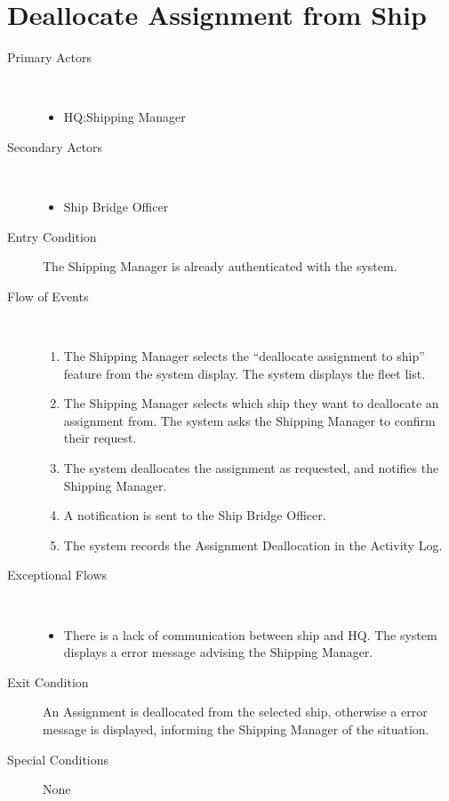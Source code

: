 \documentclass[a4paper,10pt]{report}
\begin{document}
\section{Deallocate Assignment from Ship}
\begin{description}
\item[Primary Actors] \
  \begin{itemize}
    \item HQ:Shipping Manager
  \end{itemize}
\item[Secondary Actors] \
  \begin{itemize}
    \item Ship Bridge Officer
  \end{itemize}
\item[Entry Condition]
  The Shipping Manager is already authenticated with the system.
\item[Flow of Events] \
  \begin{enumerate}
    \item The Shipping Manager selects the ``deallocate assignment to ship'' feature from the system display. The system displays the fleet list.
    \item The Shipping Manager selects which ship they want to deallocate an assignment from. The system asks the Shipping Manager to confirm their request.
    \item The system deallocates the assignment as requested, and notifies the Shipping Manager.
    \item A notification is sent to the Ship Bridge Officer.
    \item The system records the Assignment Deallocation in the Activity Log.
  \end{enumerate}
\item[Exceptional Flows] \
  \begin{itemize}
   \item There is a lack of communication between ship and HQ. The system displays a error message advising the Shipping Manager.
  \end{itemize}
\item[Exit Condition]
  An Assignment is deallocated from the selected ship, otherwise a error message is displayed, informing the Shipping Manager of the situation.
\item[Special Conditions] None
\end{description}
\end{document}
